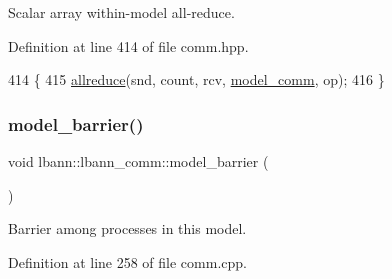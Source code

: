 Scalar array within-\/model all-\/reduce. 

Definition at line 414 of file comm.\+hpp.


\begin{DoxyCode}
414                                                                          \{
415     \hyperlink{classlbann_1_1lbann__comm_af5631e5f0f54e4df4958eba9df2599ef}{allreduce}(snd, count, rcv, \hyperlink{classlbann_1_1lbann__comm_a58a75b76bd61ec8a26c1cbbec3dc2f45}{model\_comm}, op);
416   \}
\end{DoxyCode}
\mbox{\label{classlbann_1_1lbann__comm_a6086ced12c3eefeea6e2a78eff286983}} 
\subsubsection{\texorpdfstring{model\+\_\+barrier()}{model\_barrier()}}
{\footnotesize\ttfamily void lbann\+::lbann\+\_\+comm\+::model\+\_\+barrier (\begin{DoxyParamCaption}{ }\end{DoxyParamCaption})}

Barrier among processes in this model. 

Definition at line 258 of file comm.\+cpp.


